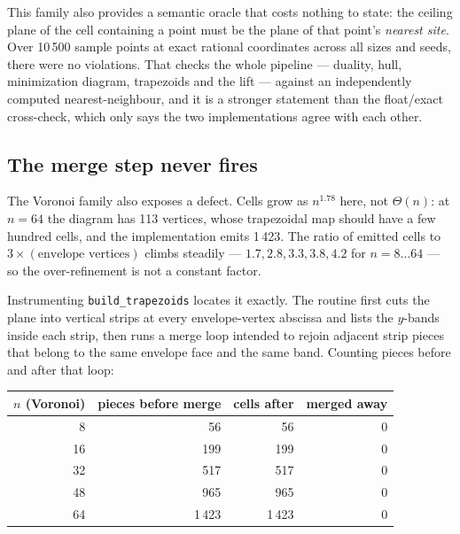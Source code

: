 \documentclass[11pt]{article}
\begin{document}
This family also provides a semantic oracle that costs nothing to state: the
ceiling plane of the cell containing a point must be the plane of that point's
\emph{nearest site}.  Over 10\,500 sample points at exact rational coordinates
across all sizes and seeds, there were no violations.  That checks the whole
pipeline --- duality, hull, minimization diagram, trapezoids and the lift ---
against an independently computed nearest-neighbour, and it is a stronger
statement than the float/exact cross-check, which only says the two
implementations agree with each other.





\subsection{The merge step never fires}
\label{sec:bench-merge}

The Voronoi family also exposes a defect.  Cells grow as $n^{1.78}$ here, not
$\Theta(n)$: at $n = 64$ the diagram has 113 vertices, whose trapezoidal map
should have a few hundred cells, and the implementation emits 1\,423.  The
ratio of emitted cells to $3 \times (\text{envelope vertices})$ climbs
steadily --- $1.7, 2.8, 3.3, 3.8, 4.2$ for $n = 8 \dots 64$ --- so the
over-refinement is not a constant factor.

Instrumenting \texttt{build\_trapezoids} locates it exactly.  The routine first
cuts the plane into vertical strips at every envelope-vertex abscissa and lists
the $y$-bands inside each strip, then runs a merge loop intended to rejoin
adjacent strip pieces that belong to the same envelope face and the same band.
Counting pieces before and after that loop:

\begin{center}
\begin{tabular}{rrrr}
\toprule
$n$ (Voronoi) & pieces before merge & cells after & merged away \\
\midrule
8  & 56    & 56    & 0 \\
16 & 199   & 199   & 0 \\
32 & 517   & 517   & 0 \\
48 & 965   & 965   & 0 \\
64 & 1\,423 & 1\,423 & 0 \\
\bottomrule
\end{tabular}
\end{center}
\end{document}
